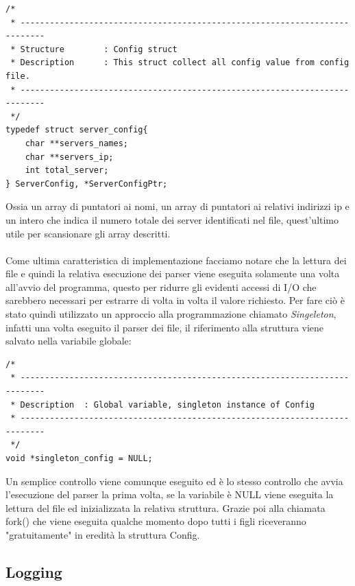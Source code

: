 \documentclass[italian]{tktltiki2}
\begin{document}
\begin{lstlisting}
/*
 * ---------------------------------------------------------------------------
 * Structure        : Config struct
 * Description      : This struct collect all config value from config file.
 * ---------------------------------------------------------------------------
 */
typedef struct server_config{
    char **servers_names;
    char **servers_ip;
    int total_server;
} ServerConfig, *ServerConfigPtr;
\end{lstlisting}
Ossia un array di puntatori ai nomi, un array di puntatori ai relativi indirizzi ip e un intero che indica il numero totale dei server identificati nel file, quest'ultimo utile per scansionare gli array descritti.
\\\\Come ultima caratteristica di implementazione facciamo notare che la lettura dei file e quindi la relativa esecuzione dei parser viene eseguita solamente una volta all'avvio del programma, questo per ridurre gli evidenti accessi di I/O che sarebbero necessari per estrarre di volta in volta il valore richiesto. Per fare ciò è stato quindi utilizzato un approccio alla programmazione chiamato \emph{Singeleton}, infatti una volta eseguito il parser dei file, il riferimento alla struttura viene salvato nella variabile globale:

\begin{lstlisting}
/*
 * ---------------------------------------------------------------------------
 * Description  : Global variable, singleton instance of Config
 * ---------------------------------------------------------------------------
 */
void *singleton_config = NULL;
\end{lstlisting}
Un semplice controllo viene comunque eseguito ed è lo stesso controllo che avvia l'esecuzione del parser la prima volta, se la variabile è NULL viene eseguita la lettura del file ed inizializzata la relativa struttura. Grazie poi alla chiamata fork() che viene eseguita qualche momento dopo tutti i figli riceveranno "gratuitamente" in eredità la struttura Config.

\subsection{Logging}
\label{sec:logging}
\end{document}
